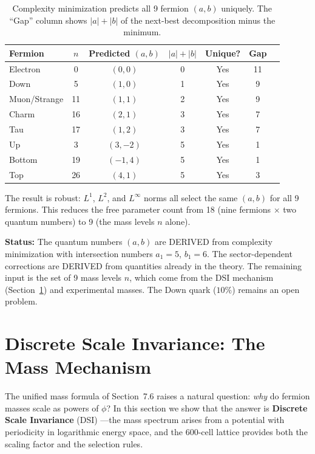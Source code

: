 \documentclass[12pt,a4paper]{article}
\begin{document}
\begin{table}[H]
\centering
\begin{tabular}{lcccccc}
\toprule
\textbf{Fermion} & $n$ & \textbf{Predicted} $(a,b)$ & $|a|+|b|$ & \textbf{Unique?} & \textbf{Gap} \\
\midrule
Electron & 0 & $(0,0)$ & 0 & Yes & 11 \\
Down & 5 & $(1,0)$ & 1 & Yes & 9 \\
Muon/Strange & 11 & $(1,1)$ & 2 & Yes & 9 \\
Charm & 16 & $(2,1)$ & 3 & Yes & 7 \\
Tau & 17 & $(1,2)$ & 3 & Yes & 7 \\
Up & 3 & $(3,-2)$ & 5 & Yes & 1 \\
Bottom & 19 & $(-1,4)$ & 5 & Yes & 1 \\
Top & 26 & $(4,1)$ & 5 & Yes & 3 \\
\bottomrule
\end{tabular}
\caption{Complexity minimization predicts all 9 fermion $(a,b)$ uniquely. The ``Gap'' column shows $|a|+|b|$ of the next-best decomposition minus the minimum.}
\label{tab:complexity}
\end{table}

The result is robust: $L^1$, $L^2$, and $L^\infty$ norms all select the same $(a,b)$ for all 9 fermions. This reduces the free parameter count from 18 (nine fermions $\times$ two quantum numbers) to 9 (the mass levels $n$ alone).

\textbf{Status:} The quantum numbers $(a,b)$ are DERIVED from complexity minimization with intersection numbers $a_1 = 5$, $b_1 = 6$. The sector-dependent corrections are DERIVED from quantities already in the theory. The remaining input is the set of 9 mass levels $n$, which come from the DSI mechanism (Section~\ref{sec:dsi}) and experimental masses. The Down quark ($10\%$) remains an open problem.

\section{Discrete Scale Invariance: The Mass Mechanism}
\label{sec:dsi}

The unified mass formula of Section~7.6 raises a natural question: \emph{why} do fermion masses scale as powers of $\phi$? In this section we show that the answer is \textbf{Discrete Scale Invariance} (DSI) \cite{sornette1998}---the mass spectrum arises from a potential with periodicity in logarithmic energy space, and the 600-cell lattice provides both the scaling factor and the selection rules.
\end{document}

